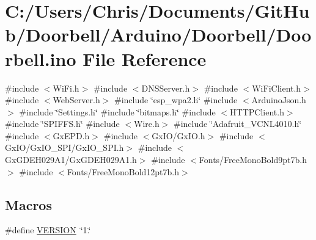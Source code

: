 \hypertarget{_doorbell_8ino}{}\section{C\+:/\+Users/\+Chris/\+Documents/\+Git\+Hub/\+Doorbell/\+Arduino/\+Doorbell/\+Doorbell.ino File Reference}
\label{_doorbell_8ino}
{\ttfamily \#include $<$Wi\+Fi.\+h$>$}\newline
{\ttfamily \#include $<$D\+N\+S\+Server.\+h$>$}\newline
{\ttfamily \#include $<$Wi\+Fi\+Client.\+h$>$}\newline
{\ttfamily \#include $<$Web\+Server.\+h$>$}\newline
{\ttfamily \#include \char`\"{}esp\+\_\+wpa2.\+h\char`\"{}}\newline
{\ttfamily \#include $<$Arduino\+Json.\+h$>$}\newline
{\ttfamily \#include \char`\"{}Settings.\+h\char`\"{}}\newline
{\ttfamily \#include \char`\"{}bitmaps.\+h\char`\"{}}\newline
{\ttfamily \#include $<$H\+T\+T\+P\+Client.\+h$>$}\newline
{\ttfamily \#include \char`\"{}S\+P\+I\+F\+F\+S.\+h\char`\"{}}\newline
{\ttfamily \#include $<$Wire.\+h$>$}\newline
{\ttfamily \#include \char`\"{}Adafruit\+\_\+\+V\+C\+N\+L4010.\+h\char`\"{}}\newline
{\ttfamily \#include $<$Gx\+E\+P\+D.\+h$>$}\newline
{\ttfamily \#include $<$Gx\+I\+O/\+Gx\+I\+O.\+h$>$}\newline
{\ttfamily \#include $<$Gx\+I\+O/\+Gx\+I\+O\+\_\+\+S\+P\+I/\+Gx\+I\+O\+\_\+\+S\+P\+I.\+h$>$}\newline
{\ttfamily \#include $<$Gx\+G\+D\+E\+H029\+A1/\+Gx\+G\+D\+E\+H029\+A1.\+h$>$}\newline
{\ttfamily \#include $<$Fonts/\+Free\+Mono\+Bold9pt7b.\+h$>$}\newline
{\ttfamily \#include $<$Fonts/\+Free\+Mono\+Bold12pt7b.\+h$>$}\newline
\subsection*{Macros}
\begin{DoxyCompactItemize}
\item 
\#define \mbox{\hyperlink{_doorbell_8ino_a1c6d5de492ac61ad29aec7aa9a436bbf}{V\+E\+R\+S\+I\+ON}}~\char`\"{}1.\char`\"{}
\end{DoxyCompactItemize}

